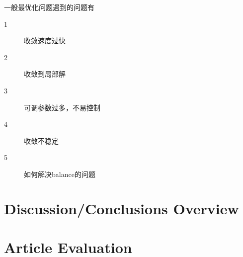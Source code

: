 \documentclass[
10pt, %
a4paper, %
twocolumn, %
landscape %
]{article}
\begin{document}
\begin{CJK*}{UTF8}{gbsn}
一般最优化问题遇到的问题有

\begin{description}
\item[1] 收敛速度过快
\item[2] 收敛到局部解
\item[3] 可调参数过多，不易控制
\item[4] 收敛不稳定
\item[5] 如何解决balance的问题
\end{description}


\section{Discussion/Conclusions Overview}


\section*{Article Evaluation}




\renewcommand{\refname}{Reference} %


\end{CJK*}
\end{document}
